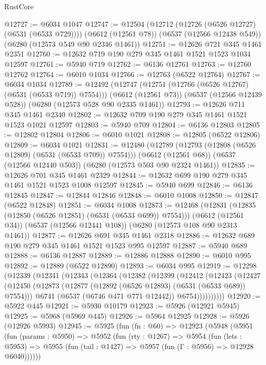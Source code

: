 \begin{lexlean}{RustCore}
\begin{coremodule}
@12727 := @6034 @1047
@12747 := @12504
    (@12712 (@12726 (@6526 @12727) (@6531 (@6533 @729))))
    (@6612 (@12561 @78))
    (@6537 (@12566 @12438 @549))
    (@6280 (@12573 @549 @90 @2346 @1461))
@12751 := @12626 @721 @345 @1461 @2351
@12760 := @12632 @719 @190 @279 @345 @1461 @1521 @1523 @1034 @12597
@12761 := @5940 @719
@12762 := @6136 @12761
@12763 := @12760 @12762
@12764 := @6010 @1034
@12766 := @12763 (@6522 @12764)
@12767 := @6034 @1034
@12789 := @12492
    (@12747 (@12751 (@12766 (@6526 @12767) (@6531 (@6533 @719)) @7554)))
    (@6612 (@12561 @73))
    (@6537 (@12566 @12439 @528))
    (@6280 (@12573 @528 @90 @2335 @1461))
@12793 := @12626 @711 @345 @1461 @2340
@12802 := @12632 @709 @190 @279 @345 @1461 @1521 @1523 @1021 @12597
@12803 := @5940 @709
@12804 := @6136 @12803
@12805 := @12802 @12804
@12806 := @6010 @1021
@12808 := @12805 (@6522 @12806)
@12809 := @6034 @1021
@12831 := @12480
    (@12789 (@12793 (@12808 (@6526 @12809) (@6531 (@6533 @709)) @7554)))
    (@6612 (@12561 @68))
    (@6537 (@12566 @12440 @503))
    (@6280 (@12573 @503 @90 @2324 @1461))
@12835 := @12626 @701 @345 @1461 @2329
@12844 := @12632 @699 @190 @279 @345 @1461 @1521 @1523 @1008 @12597
@12845 := @5940 @699
@12846 := @6136 @12845
@12847 := @12844 @12846
@12848 := @6010 @1008
@12850 := @12847 (@6522 @12848)
@12851 := @6034 @1008
@12873 := @12468
    (@12831 (@12835 (@12850 (@6526 @12851) (@6531 (@6533 @699)) @7554)))
    (@6612 (@12561 @34))
    (@6537 (@12566 @12441 @108))
    (@6280 (@12573 @108 @90 @2313 @1461))
@12877 := @12626 @691 @345 @1461 @2318
@12886 := @12632 @689 @190 @279 @345 @1461 @1521 @1523 @995 @12597
@12887 := @5940 @689
@12888 := @6136 @12887
@12889 := @12886 @12888
@12890 := @6010 @995
@12892 := @12889 (@6522 @12890)
@12893 := @6034 @995
@12919 := @12298
    (@12339
      (@12341
        (@12343
          (@12364
            (@12382
              (@12399
                (@12412
                  (@12423
                    (@12427
                      (@12450
                        (@12873 (@12877 (@12892 (@6526 @12893) (@6531 (@6533 @689)) @7554)))
                        @6741
                        (@6537 (@6746 @471 @771 @12442))
                        @6754))))))))))
@12920 := @5922 @445
@12921 := @5930 @10179
@12923 := @5926 (@12921 @5945)
@12925 := @5968 (@5969 @445)
@12926 := @5964 @12925
@12928 := @5926 (@12926 @5993)
@12945 := @5925
    (fun (fn : @60) =>
    @12923
      (@5948
        (@5951
          (fun (params : @5950) =>
          @5952
            (fun (rty : @1267) =>
            @5954
              (fun (lets : @5953) =>
              @5955 (fun (tail : @1427) => @5957 (fun (Γ : @5956) => @12928 @6040))))))

\end{coremodule}
\end{lexlean}
